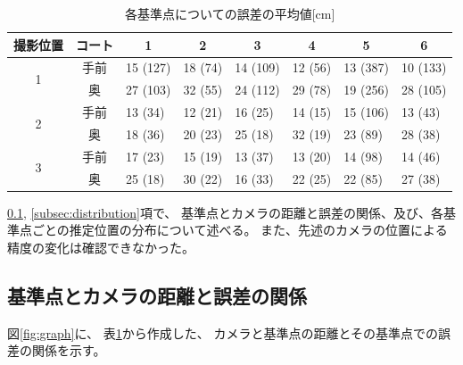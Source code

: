 \documentclass[a4j, fleqn, 12pt]{jsreport}
\begin{document}
        \begin{table}[ht]
            \centering
            \caption{各基準点についての誤差の平均値[cm]}
            \label{tab:accuracy}
            \small
            \begin{tabular}{c|c||llllll} \hline
                撮影位置 & コート & \multicolumn{1}{c}{1} & \multicolumn{1}{c}{2} & \multicolumn{1}{c}{3} & \multicolumn{1}{c}{4} & \multicolumn{1}{c}{5} & \multicolumn{1}{c}{6} \\ \hline\hline
                \multirow{2}{*}{1} & 手前 & 15 \footnotesize{(127)} & 18 \footnotesize{(74)} & 14 \footnotesize{(109)} & 12 \footnotesize{(56)} & 13 \footnotesize{(387)} & 10 \footnotesize{(133)} \\
                & 奥 & 27 \footnotesize{(103)} & 32 \footnotesize{(55)} & 24 \footnotesize{(112)} & 29 \footnotesize{(78)} & 19 \footnotesize{(256)} & 28 \footnotesize{(105)} \\ \hline
                \multirow{2}{*}{2} & 手前 & 13 \footnotesize{(34)} & 12 \footnotesize{(21)} & 16 \footnotesize{(25)} & 14 \footnotesize{(15)} & 15 \footnotesize{(106)} & 13 \footnotesize{(43)} \\
                & 奥 & 18 \footnotesize{(36)} & 20 \footnotesize{(23)} & 25 \footnotesize{(18)} & 32 \footnotesize{(19)} & 23 \footnotesize{(89)} & 28 \footnotesize{(38)} \\ \hline
                \multirow{2}{*}{3} & 手前 & 17 \footnotesize{(23)} & 15 \footnotesize{(19)} & 13 \footnotesize{(37)} & 13 \footnotesize{(20)} & 14 \footnotesize{(98)} & 14 \footnotesize{(46)} \\
                & 奥 & 25 \footnotesize{(18)} & 30 \footnotesize{(22)} & 16 \footnotesize{(33)} & 22 \footnotesize{(25)} & 22 \footnotesize{(85)} & 27 \footnotesize{(38)} \\ \hline
            \end{tabular}
        \end{table}

        \ref{subsec:distance}, \ref{subsec:distribution}項で、
        基準点とカメラの距離と誤差の関係、及び、各基準点ごとの推定位置の分布について述べる。
        また、先述のカメラの位置による精度の変化は確認できなかった。

        \subsection{基準点とカメラの距離と誤差の関係} \label{subsec:distance}
            図\ref{fig:graph}に、
            表\ref{tab:accuracy}から作成した、
            カメラと基準点の距離とその基準点での誤差の関係を示す。
\end{document}
